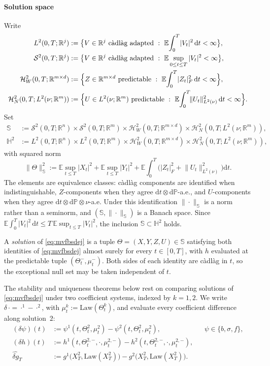 \documentclass[preprint,12pt]{elsarticle}
\newcommand{\R}{\mathbb{R}}
\newcommand{\E}{\mathbb{E}}
\newcommand{\Prob}{\mathbb{P}}
\newcommand{\diff}{\mathrm{d}}
\newcommand{\Lnu}{L^2(\nu)}
\newcommand{\Law}{\mathrm{Law}}
\newcommand{\HH}{\mathbb{S}}
\newcommand{\Ssp}[1]{\mathcal{S}^2(0,T;#1)}
\newcommand{\HW}{\mathcal{H}^2_W}
\newcommand{\HN}{\mathcal{H}^2_N}
\newcommand{\Lsp}[1]{L^2(0,T;#1)}
\newcommand{\Hweak}{\mathbb{H}^2}
\newcommand{\Lnorm}[1]{\lVert #1\rVert_{\Lnu}}
\providecommand{\PaperRunIn}[1]{\paragraph{#1.}}
\numberwithin{equation}{section}
\theoremstyle{plain}
\theoremstyle{definition}
\theoremstyle{\PaperRemarkStyle}
\renewcommand{\PaperRunIn}[1]{\paragraph{#1}}
\begin{document}
\PaperRunIn{Solution space}
Write
\[
\begin{aligned}
\Lsp{\R^j}&:=\bigl\{V\in\R^j\ \text{c\`adl\`ag adapted}\ :\ \E\!\int_0^T\!|V_t|^2\,\diff t<\infty\bigr\},\\
\Ssp{\R^j}&:=\bigl\{V\in\R^j\ \text{c\`adl\`ag adapted}\ :\ \E\sup_{0\le t\le T}|V_t|^2<\infty\bigr\},\\
\HW(0,T;\R^{m\times d})&:=\Bigl\{Z\in\R^{m\times d}\ \text{predictable}\ :\ \E\!\int_0^T\!|Z_t|_F^2\,\diff t<\infty\Bigr\},\\
\HN(0,T;L^2(\nu;\R^m))&:=\Bigl\{U\in L^2(\nu;\R^m)\ \text{predictable}\ :\ \E\!\int_0^T\!\Lnorm{U_t}^2\,\diff t<\infty\Bigr\}.
\end{aligned}
\]
Set
\[
\begin{aligned}
\HH&:=\Ssp{\R^n}\times\Ssp{\R^m}\times\HW(0,T;\R^{m\times d})\times\HN(0,T;L^2(\nu;\R^m)),\\
\Hweak&:=\Lsp{\R^n}\times\Lsp{\R^m}\times\HW(0,T;\R^{m\times d})\times\HN(0,T;L^2(\nu;\R^m)),
\end{aligned}
\]
with squared norm
\[
\|\Theta\|_{\HH}^2:=\E\sup_{t\le T}|X_t|^2+\E\sup_{t\le T}|Y_t|^2
+\E\!\int_0^T\!\big(|Z_t|_F^2+\Lnorm{U_t}^2\big)\diff t.
\]
The elements are equivalence classes: c\`adl\`ag components are identified when
indistinguishable, $Z$-components when they agree $\diff t\otimes\diff\Prob$-a.e., and
$U$-components when they agree $\diff t\otimes\diff\Prob\otimes\nu$-a.e. Under this
identification $\|\cdot\|_{\HH}$ is a norm rather than a seminorm, and
$(\HH,\|\cdot\|_{\HH})$ is a Banach space. Since
$\E\int_0^T|V_t|^2\,\diff t\le T\,\E\sup_{t\le T}|V_t|^2$, the inclusion
$\HH\subset\Hweak$ holds.

A \emph{solution} of \eqref{eq:mvfbsdej} is a tuple $\Theta=(X,Y,Z,U)\in\HH$ satisfying both
identities of \eqref{eq:mvfbsdej} almost surely for every $t\in[0,T]$, with $h$ evaluated at
the predictable tuple $(\Theta^-_t,\mu^-_t)$. Both sides of each identity are c\`adl\`ag in
$t$, so the exceptional null set may be taken independent of $t$.

The stability and uniqueness theorems below rest on comparing solutions of
\eqref{eq:mvfbsdej} under two coefficient systems, indexed by $k=1,2$. We write $\delta\,{\cdot}={\cdot}^1-{\cdot}^2$, with
$\mu^k_t:=\Law(\Theta^k_t)$, and evaluate every coefficient difference along solution~$2$:
\[
\begin{aligned}
(\delta\psi)(t)&:=\psi^1(t,\Theta^2_t,\mu^2_t)-\psi^2(t,\Theta^2_t,\mu^2_t),
&&\psi\in\{b,\sigma,f\},\\
(\delta h)(t)&:=h^1(t,\Theta^{2,-}_t,\cdot,\mu^{2,-}_t)-h^2(t,\Theta^{2,-}_t,\cdot,\mu^{2,-}_t),\\
\widehat{\delta g}_T&:=g^1\big(X^2_T,\Law(X^2_T)\big)-g^2\big(X^2_T,\Law(X^2_T)\big).
\end{aligned}
\]
\end{document}
